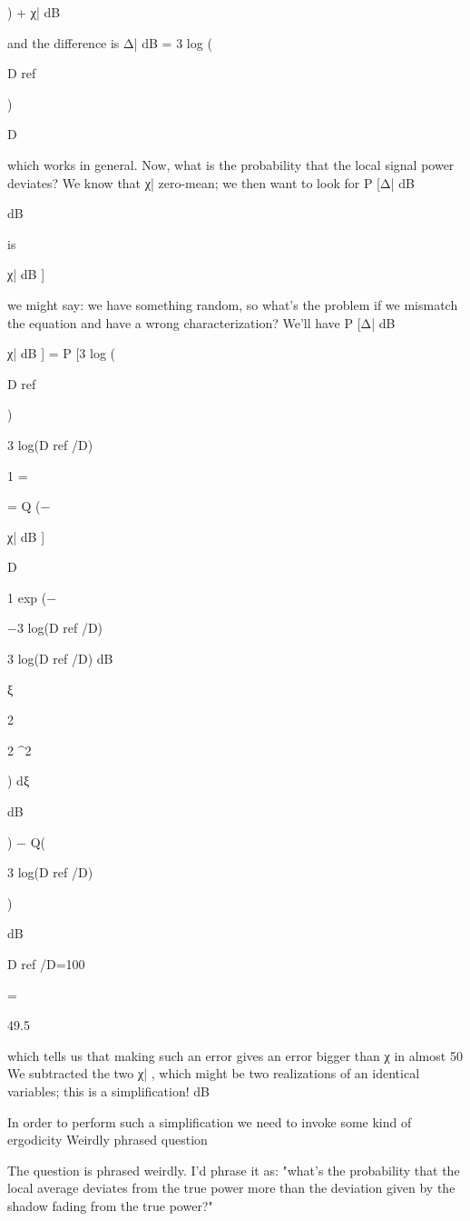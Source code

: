 {{{{{) + χ| dB

and the difference is Δ| dB = 3 log (

D ref

)

D

which works in general.
Now, what is the probability that the local signal power deviates? We know that χ|
zero-mean; we then want to look for P [Δ| dB \geq

dB

is

χ| dB ]

we might say: we have something random, so what's the problem if we mismatch the equation and have a wrong characterization?
We'll have P [Δ| dB \geq

χ| dB ] = P [3 log (

D ref

) \geq

3 log(D ref /D)

1
=

\int
{}

= Q (−

χ| dB ]

D

1 exp (−

−3 log(D ref /D)

3 log(D ref /D)
\sigma dB

ξ

2

2 \sigma^2

) dξ

dB

) − Q(

3 log(D ref /D)

)

\sigma dB

D ref /D=100

=

49.5%

which tells us that making such an error gives an error bigger than χ in almost 50%
We subtracted the two χ| , which might be two realizations of an identical variables;
this is a simplification!
dB

In order to perform such a simplification we need to invoke some kind of ergodicity
​Weirdly phrased question

The question is phrased weirdly. I'd phrase it as: "what's the probability that the local average deviates from the true power more than the deviation given by the shadow fading from the true power?"

}}}}}

